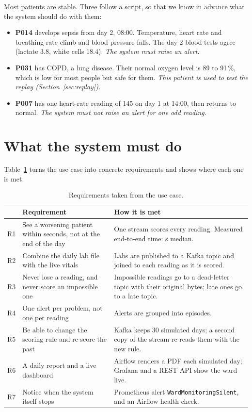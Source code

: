 \documentclass[11pt,a4paper]{article}
\begin{document}
Most patients are stable. Three follow a script, so that we know in advance what the
system should do with them:

\begin{itemize}
  \item \textbf{P014} develops sepsis from day 2, 08:00. Temperature, heart rate and
  breathing rate climb and blood pressure falls. The day-2 blood tests agree (lactate
  3.8, white cells 18.4). \emph{The system must raise an alert.}
  \item \textbf{P031} has COPD, a lung disease. Their normal oxygen level is 89 to
  91\,\%, which is low for most people but safe for them. \emph{This patient is used to
  test the replay (Section~\ref{sec:replay}).}
  \item \textbf{P007} has one heart-rate reading of 145 on day 1 at 14:00, then returns
  to normal. \emph{The system must not raise an alert for one odd reading.}
\end{itemize}

\section{What the system must do}

Table~\ref{tab:req} turns the use case into concrete requirements and shows where each
one is met.

\begin{table}[H]\centering\small
\begin{tabularx}{\linewidth}{|l|X|X|}
\hline
\rowcolor{tablehead}& \textbf{Requirement} & \textbf{How it is met} \\ \hline
R1 & See a worsening patient within seconds, not at the end of the day &
One stream scores every reading. Measured end-to-end time: \mLatencyPfifty{} s median. \\ \hline
R2 & Combine the daily lab file with the live vitals & Labs are published to a Kafka
topic and joined to each reading as it is scored. \\ \hline
R3 & Never lose a reading, and never score an impossible one & Impossible readings go
to a dead-letter topic with their original bytes; late ones go to a late topic. \\ \hline
R4 & One alert per problem, not one per reading & Alerts are grouped into episodes. \\ \hline
R5 & Be able to change the scoring rule and re-score the past & Kafka keeps 30
simulated days; a second copy of the stream re-reads them with the new rule. \\ \hline
R6 & A daily report and a live dashboard & Airflow renders a PDF each simulated day;
Grafana and a REST API show the ward live. \\ \hline
R7 & Notice when the system itself stops & Prometheus alert
\texttt{WardMonitoringSilent}, and an Airflow health check. \\ \hline
\end{tabularx}
\caption{Requirements taken from the use case.}\label{tab:req}
\end{table}
\end{document}
